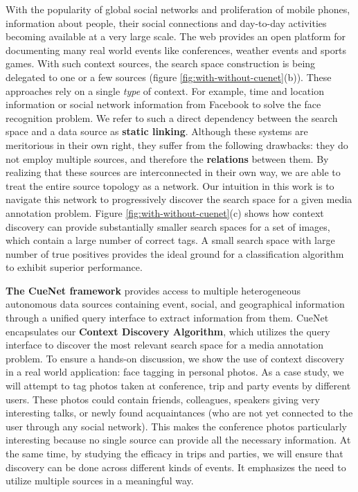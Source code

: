 With the popularity of global social networks and proliferation of mobile phones, information about people, their social connections and day-to-day activities becoming available at a very large scale. The web provides an open platform for documenting many real world events like conferences, weather events and sports games. With such context sources, the search space construction is being delegated to one or a few sources \cite{henter2012tag, li2012fusing, naaman2005identity, o2009context,  stone2008autotagging} (figure \ref{fig:with-without-cuenet}(b)). These approaches rely on a single \textit{type} of context. For example, time and location information or social network information from Facebook to solve the face recognition problem. We refer to such a direct dependency between the search space and a data source as \textbf{static linking}. Although these systems are meritorious in their own right, they suffer from the following drawbacks: they do not employ multiple sources, and therefore the \textbf{relations} between them. By realizing that these sources are interconnected in their own way, we are able to treat the entire source topology as a network. Our intuition in this work is to navigate this network to progressively discover the search space for a given media annotation problem. Figure \ref{fig:with-without-cuenet}(c) shows how context discovery can provide substantially smaller search spaces for a set of images, which contain a large number of correct tags. A small search space with large number of true positives provides the ideal ground for a classification algorithm to exhibit superior performance.

\textbf{The CueNet framework} provides access to multiple heterogeneous autonomous data sources containing event, social, and geographical information through a unified query interface to extract information from them. CueNet encapsulates our \textbf{Context Discovery Algorithm}, which utilizes the query interface to discover the most relevant search space for a media annotation problem. To ensure a hands-on discussion, we show the use of context discovery in a real world application: face tagging in personal photos. As a case study, we will attempt to tag photos taken at conference, trip and party events by different users. These photos could contain friends, colleagues, speakers giving very interesting talks, or newly found acquaintances (who are not yet connected to the user through any social network). This makes the conference photos particularly interesting because no single source can provide all the necessary information. At the same time, by studying the efficacy in trips and parties, we will ensure that discovery can be done across different kinds of events. It emphasizes the need to utilize multiple sources in a meaningful way.

